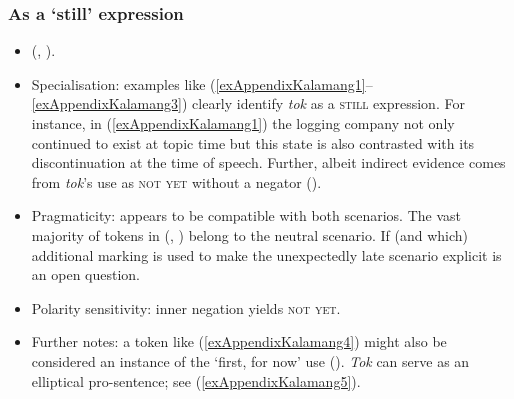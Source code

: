 \subsubsection{As a \lq{}still\rq{ }expression}
\begin{itemize}
		\item \citeauthor{VisserKalamangDictionary} (\citeyear*{VisserKalamangDictionary}, \citeyear[354–358]{Visser2022}).
		\item Specialisation: examples like (\ref{exAppendixKalamang1}–\ref{exAppendixKalamang3}) clearly identify \textit{tok} as a \textsc{still} expression. For instance, in (\ref{exAppendixKalamang1}) the logging company not only continued to exist at topic time but this state is also contrasted with its discontinuation at the time of speech. Further, albeit indirect evidence comes from \textit{tok}'s use as \textsc{not yet} without a negator ().
		\item Pragmaticity: appears to be compatible with both scenarios. The vast majority of tokens in \citeauthor{Visser2021a} (\citeyear*{Visser2021a}, \citeyear*{Visser2021b}) belong to the neutral scenario. If (and which) additional marking is used to make the unexpectedly late scenario explicit is an open question.
		\item Polarity sensitivity: inner negation yields \textsc{not yet}.
		\item Further notes: a token like (\ref{exAppendixKalamang4}) might also be considered an instance of the \lq first, for now\rq{ }use (). \textit{Tok} can serve as an elliptical pro\hyp sentence; see (\ref{exAppendixKalamang5}).
\end{itemize}

